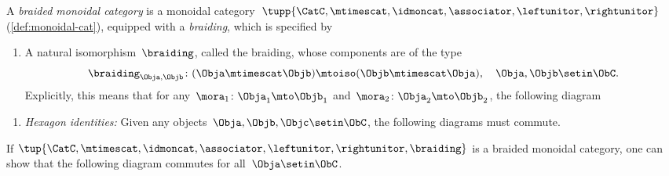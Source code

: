 

\begin{ctdefinition}
    \label{def:braided_moncat}
    A \emph{braided monoidal category} is a monoidal category~$\tupp{\CatC,\mtimescat, \idmoncat, \associator, \leftunitor, \rightunitor}$ (\cref{def:monoidal-cat}), equipped with a \emph{braiding}, which is specified by

    \constit
    \begin{enumerate}
        \item A natural isomorphism~$\braiding$, called the braiding, whose components are of the type
              \begin{equation}
                  \label{eq:braiding_symmetry}
                  \braiding_{\Obja,\Objb}\colon (\Obja\mtimescat \Objb)\mtoiso (\Objb\mtimescat \Obja), \quad \Obja,\Objb \setin \ObC.
              \end{equation}
              Explicitly, this means that for any~$\mora_1\colon \Obja_1\mto \Objb_1$ and~$\mora_2\colon \Obja_2\mto \Objb_2$, the following diagram
              \begin{center}
              \end{center}
    \end{enumerate}

    \condit
    \begin{enumerate}
        \item \emph{Hexagon identities:} Given any objects~$\Obja,\Objb,\Objc\setin \ObC$, the following diagrams must commute.
    \end{enumerate}
    \begin{center}
    \end{center}
    \begin{center}
    \end{center}
\end{ctdefinition}

\begin{remark}
    If $\tup{\CatC,\mtimescat, \idmoncat, \associator, \leftunitor, \rightunitor, \braiding}$ is a braided monoidal category, one can show that the following diagram commutes for all~$\Obja \setin \ObC$.
    \begin{center}
    \end{center}
\end{remark}


